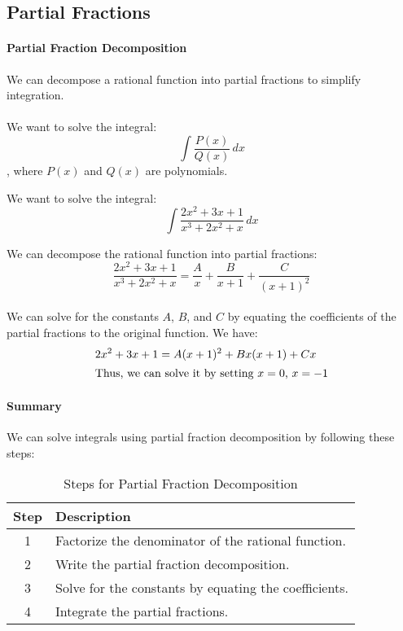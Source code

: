 \documentclass[11pt]{article}
\begin{document}
\subsection{Partial Fractions}
\paragraph{Partial Fraction Decomposition} We can decompose a rational function into partial fractions to simplify integration.
\paragraph{} We want to solve the integral:
\begin{equation}
    \int \frac{P(x)}{Q(x)} \, dx
\end{equation}
, where $P(x)$ and $Q(x)$ are polynomials.
\begin{example}
We want to solve the integral:
$$ \int \frac{2x^2 + 3x + 1}{x^3 + 2x^2 + x} \, dx $$
\end{example}
We can decompose the rational function into partial fractions:
$$ \frac{2x^2 + 3x + 1}{x^3 + 2x^2 + x} = \frac{A}{x} + \frac{B}{x+1} + \frac{C}{(x+1)^2} $$
\paragraph{} We can solve for the constants $A$, $B$, and $C$ by equating the coefficients of the partial fractions to the original function. We have:
\begin{align*}
    2x^2 + 3x + 1 &= A(x+1)^2 + Bx(x+1) + Cx \\
    \intertext{Thus, we can solve it by setting $x = 0$, $x = -1$}
\end{align*}
\paragraph{Summary} We can solve integrals using partial fraction decomposition by following these steps:
\begin{table}[h!]
    \centering
    \begin{tabular}{|c|l|}
    \hline
    \textbf{Step} & \textbf{Description} \\ \hline
    1 & Factorize the denominator of the rational function. \\
    2 & Write the partial fraction decomposition. \\
    3 & Solve for the constants by equating the coefficients. \\
    4 & Integrate the partial fractions. \\ \hline
    \end{tabular}
    \caption{Steps for Partial Fraction Decomposition}
\end{table}
\end{document}

